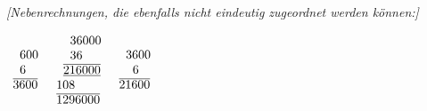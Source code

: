    \pstart \noindent \textit{[Nebenrechnungen, die ebenfalls nicht eindeutig zugeordnet werden k\"onnen:]}\\ \vspace{1.0ex} \begin{center}
$\begin{array}{l} \hspace{5.5pt}600\\\hspace{5.5pt}6\\\overline{3600}\end{array}$ \hspace{10mm}
$\begin{array}{l} \hspace{11pt}36000\\\hspace{11pt}36\\\hspace{5.5pt}\underline{\overline{216000}}\\108\\\overline{1296000}\end{array}$
\hspace{10mm}
$\begin{array}{l} \hspace{5.5pt}3600\\\hspace{11pt}6\\\overline{21600}\end{array}$
\end{center}\pend
